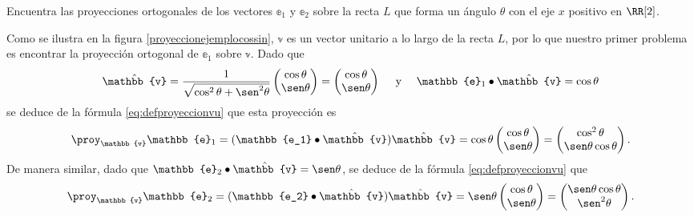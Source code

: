 \begin{examplebox}{}{}
    Encuentra las proyecciones ortogonales de los vectores $\mathbb{e}_1$ y $\mathbb{e}_2$ sobre la recta $L$ que forma un ángulo $\theta$ con el eje $x$ positivo en $\RR[2]$.

    \tcblower
    \solucion Como se ilustra en la figura \ref{proyeccionejemplocossin}, $\mathbb{v}$ es un vector unitario a lo largo de la recta $L$, por lo que nuestro primer problema es encontrar la proyección ortogonal de $\mathbb{e}_1$ sobre $\mathbb{v}$. Dado que
    $$\hat{\mathbb{v}} = \frac{1}{\sqrt{\cos^2 \theta + \sen^2 \theta}} \begin{pmatrix}
        \cos \theta \\
        \sen \theta
    \end{pmatrix} = \begin{pmatrix}
        \cos \theta \\
        \sen \theta
    \end{pmatrix} \quad \text{ y } \quad \mathbb{e}_1 \bullet \hat{\mathbb{v}} = \cos \theta$$
    se deduce de la fórmula \eqref{eq:defproyeccionvu} que esta proyección es
    $$\proy_{\mathbb{v}}\mathbb{e}_1 = (\mathbb{e_1} \bullet \hat{\mathbb{v}})\hat{\mathbb{v}} = \cos \theta \begin{pmatrix}
        \cos \theta \\
        \sen \theta
    \end{pmatrix} = \begin{pmatrix}
        \cos^2 \theta \\
        \sen \theta \cos \theta
    \end{pmatrix}.$$
    De manera similar, dado que $\mathbb{e}_2 \bullet \hat{\mathbb{v}} = \sen \theta$, se deduce de la fórmula \eqref{eq:defproyeccionvu} que
    $$\proy_{\mathbb{v}}\mathbb{e}_2 = (\mathbb{e_2} \bullet \hat{\mathbb{v}})\hat{\mathbb{v}} = \sen \theta \begin{pmatrix}
        \cos \theta \\
        \sen \theta
    \end{pmatrix} = \begin{pmatrix}
        \sen \theta \cos \theta \\
        \sen^2 \theta
    \end{pmatrix}.$$
\end{examplebox}


